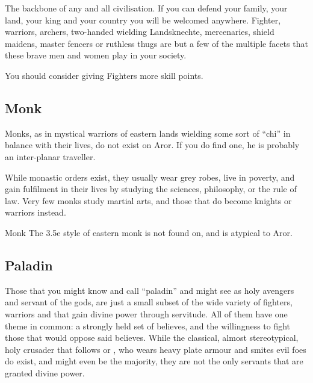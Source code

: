 The backbone of any and all civilisation. If you can defend your family, your
land, your king and your country you will be welcomed anywhere. Fighter,
warriors, archers, two-handed wielding Landsknechte, mercenaries, shield
maidens, master fencers or ruthless thugs are but a few of the multiple
facets that these brave men and women play in your society.


\begin{note}
  You should consider giving Fighters more skill points.
\end{note}

\subsection{Monk}
\label{sec:Monk}

Monks, as in mystical warriors of eastern lands wielding some sort of ``chi''
in balance with their lives, do not exist on Aror. If you do find one, he is
probably an inter-planar traveller.

While monastic orders exist, they usually wear grey robes, live in poverty,
and gain fulfilment in their lives by studying the sciences, philosophy, or
the rule of law. Very few monks study martial arts, and those that do become
knights or warriors instead.

\begin{35e}{Monk}
  The 3.5e style of eastern monk is not found on, and is atypical to Aror.
\end{35e}

\subsection{Paladin}
\label{sec:Paladin}

Those that you might know and call ``paladin'' and might see as holy avengers
and servant of the gods, are just a small subset of the wide variety of
fighters, warriors and that gain divine power through servitude. All of them
have one theme in common: a strongly held set of believes, and the willingness
to fight those that would oppose said believes. While the classical, almost
stereotypical, holy crusader that follows  or
, who wears heavy plate armour and smites evil foes do
exist, and might even be the majority, they are not the only servants that are
granted divine power.

